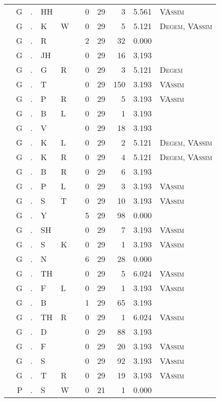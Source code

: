 \begin{longtable}{r@{ } r@{ } c@{ } l@{ } l@{ } l@{ } r r r r l }
 & G & . & HH &  &  & 0 & 29 & 3 & 5.561 & \textsc{VAssim} \\
 & G & . & K & W &  & 0 & 29 & 5 & 5.121 & \textsc{Degem}, \textsc{VAssim} \\
 & G & . & R &  &  & 2 & 29 & 32 & 0.000 &  \\
 & G & . & JH &  &  & 0 & 29 & 16 & 3.193 &  \\
 & G & . & G & R &  & 0 & 29 & 3 & 5.121 & \textsc{Degem} \\
 & G & . & T &  &  & 0 & 29 & 150 & 3.193 & \textsc{VAssim} \\
 & G & . & P & R &  & 0 & 29 & 5 & 3.193 & \textsc{VAssim} \\
 & G & . & B & L &  & 0 & 29 & 1 & 3.193 &  \\
 & G & . & V &  &  & 0 & 29 & 18 & 3.193 &  \\
 & G & . & K & L &  & 0 & 29 & 2 & 5.121 & \textsc{Degem}, \textsc{VAssim} \\
 & G & . & K & R &  & 0 & 29 & 4 & 5.121 & \textsc{Degem}, \textsc{VAssim} \\
 & G & . & B & R &  & 0 & 29 & 6 & 3.193 &  \\
 & G & . & P & L &  & 0 & 29 & 3 & 3.193 & \textsc{VAssim} \\
 & G & . & S & T &  & 0 & 29 & 10 & 3.193 & \textsc{VAssim} \\
 & G & . & Y &  &  & 5 & 29 & 98 & 0.000 &  \\
 & G & . & SH &  &  & 0 & 29 & 7 & 3.193 & \textsc{VAssim} \\
 & G & . & S & K &  & 0 & 29 & 1 & 3.193 & \textsc{VAssim} \\
 & G & . & N &  &  & 6 & 29 & 28 & 0.000 &  \\
 & G & . & TH &  &  & 0 & 29 & 5 & 6.024 & \textsc{VAssim} \\
 & G & . & F & L &  & 0 & 29 & 1 & 3.193 & \textsc{VAssim} \\
 & G & . & B &  &  & 1 & 29 & 65 & 3.193 &  \\
 & G & . & TH & R &  & 0 & 29 & 1 & 6.024 & \textsc{VAssim} \\
 & G & . & D &  &  & 0 & 29 & 88 & 3.193 &  \\
 & G & . & F &  &  & 0 & 29 & 20 & 3.193 & \textsc{VAssim} \\
 & G & . & S &  &  & 0 & 29 & 92 & 3.193 & \textsc{VAssim} \\
 & G & . & T & R &  & 0 & 29 & 19 & 3.193 & \textsc{VAssim} \\
 & P & . & S & W &  & 0 & 21 & 1 & 0.000 &  \\

\end{longtable}
